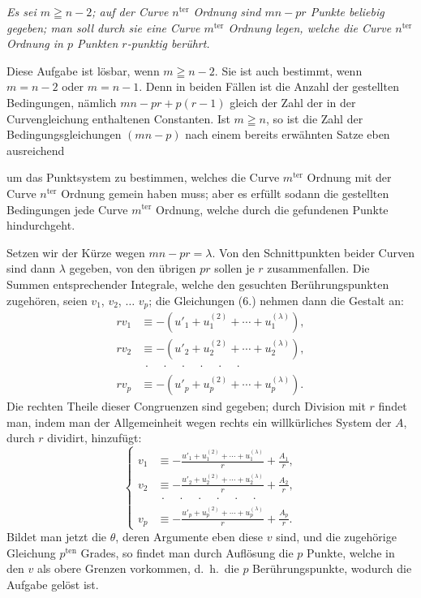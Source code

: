 \documentclass{article}
\begin{document}
\emph{Es sei $m \geqq n-2$; auf der Curve $n^{\text{ter}}$ Ordnung sind $mn-pr$ Punkte beliebig gegeben; man soll durch sie eine Curve $m^{\text{ter}}$ Ordnung legen, welche die Curve $n^{\text{ter}}$ Ordnung in $p$ Punkten $r$-punktig berührt.}

Diese Aufgabe ist lösbar, wenn $m \geqq n-2$. Sie ist auch bestimmt, wenn $m = n-2$ oder $m = n-1$. Denn in beiden Fällen ist die Anzahl der gestellten Bedingungen, nämlich $mn - pr + p(r-1)$ gleich der Zahl der in der Curvengleichung enthaltenen Constanten. Ist $m \geqq n$, so ist die Zahl der Bedingungsgleichungen $(mn - p)$ nach einem bereits erwähnten Satze eben ausreichend

um das Punktsystem zu bestimmen, welches die Curve $m^{\text{ter}}$ Ordnung mit der Curve $n^{\text{ter}}$ Ordnung gemein haben muss; aber es erfüllt sodann die gestellten Bedingungen jede Curve $m^{\text{ter}}$ Ordnung, welche durch die gefundenen Punkte hindurchgeht.

Setzen wir der Kürze wegen $mn - pr = \lambda$. Von den Schnittpunkten beider Curven sind dann $\lambda$ gegeben, von den übrigen $pr$ sollen je $r$ zusammenfallen. Die Summen entsprechender Integrale, welche den gesuchten Berührungspunkten zugehören, seien $v_{1}$, $v_{2}$, $\ldots$ $v_{p}$; die Gleichungen (6.) nehmen dann die Gestalt an:
\[
\begin{aligned}
rv_{1} &\equiv -(u'_{1} + u_{1}^{(2)} + \cdots + u_{1}^{(\lambda)}), \\
rv_{2} &\equiv -(u'_{2} + u_{2}^{(2)} + \cdots + u_{2}^{(\lambda)}), \\
&\ \cdot\quad\cdot\quad\cdot\quad\cdot\quad\cdot\quad\cdot \\
rv_{p} &\equiv -(u'_{p} + u_{p}^{(2)} + \cdots + u_{p}^{(\lambda)}).
\end{aligned}
\]
Die rechten Theile dieser Congruenzen sind gegeben; durch Division mit $r$ findet man, indem man der Allgemeinheit wegen rechts ein willkürliches System der $A$, durch $r$ dividirt, hinzufügt:
\[
\left\{
\begin{aligned}
v_{1} &\equiv -\frac{u'_{1} + u_{1}^{(2)} + \cdots + u_{1}^{(\lambda)}}{r} + \frac{A_{1}}{r}, \\
v_{2} &\equiv -\frac{u'_{2} + u_{2}^{(2)} + \cdots + u_{2}^{(\lambda)}}{r} + \frac{A_{2}}{r}, \\
&\ \cdot\quad\cdot\quad\cdot\quad\cdot\quad\cdot\quad\cdot \\
v_{p} &\equiv -\frac{u'_{p} + u_{p}^{(2)} + \cdots + u_{p}^{(\lambda)}}{r} + \frac{A_{p}}{r}.
\end{aligned}
\right.
\tag{7.}
\]
Bildet man jetzt die $\theta$, deren Argumente eben diese $v$ sind, und die zugehörige Gleichung $p^{\text{ten}}$ Grades, so findet man durch Auflösung die $p$ Punkte, welche in den $v$ als obere Grenzen vorkommen, d.\ h.\ die $p$ Berührungspunkte, wodurch die Aufgabe gelöst ist.
\end{document}
